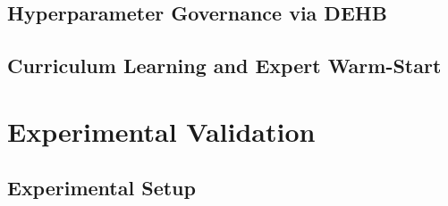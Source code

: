 \documentclass[twocolumn]{article}
\begin{document}
\subsection{Hyperparameter Governance via DEHB}

\subsection{Curriculum Learning and Expert Warm-Start}

%
%
%
%
%
\section{Experimental Validation}

\subsection{Experimental Setup}
\end{document}

